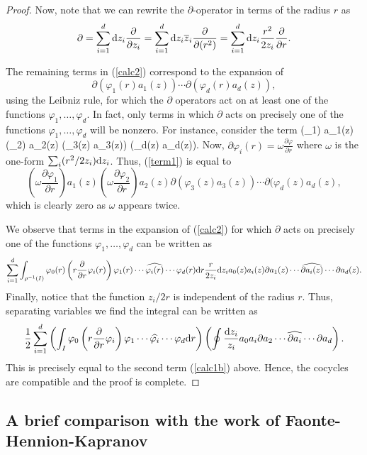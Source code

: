 \documentclass[10pt]{amsart}
\begin{document}
\begin{proof}
Now, note that we can rewrite the $\partial$-operator in terms of the radius $r$ as
\begin{align*}
\partial = \sum_{i=1}^d {\rm d} z_i \frac{\partial}{\partial z_i} = \sum_{i=1}^d {\rm d} z_i \overline{z}_i \frac{\partial}{\partial (r^2)} = \sum_{i=1}^d {\rm d} z_i \frac{r^2}{2 z_i} \frac{\partial}{\partial r} .
\end{align*}

The remaining terms in (\ref{calc2}) correspond to the expansion of
\[
\partial(\varphi_1(r) a_1(z)) \cdots \partial(\varphi_d(r) a_d(z)),
\]
using the Leibniz rule, for which the $\partial$ operators act on at least one of the functions $\varphi_1,\ldots,\varphi_d$. In fact, only terms in which $\partial$ acts on precisely one of the functions $\varphi_1,\ldots, \varphi_d$ will be nonzero. For instance, consider the term
\beqn\label{term1}
(\partial \varphi_1) a_1(z) (\partial \varphi_2) a_2(z) \partial(\varphi_3(z) a_3(z)) \cdots \partial(\varphi_d(z) a_d(z)).
\eeqn
Now, $\partial \varphi_i(r) = \omega \frac{\partial \varphi}{\partial r}$ where $\omega$ is the one-form $\sum_i (r^2 / 2 z_i) {\rm d} z_i$. Thus, (\ref{term1}) is equal to
\[
\left(\omega \frac{\partial \varphi_1}{\partial r} \right) a_1(z) \left(\omega \frac{\partial \varphi_2}{\partial r}  \right) a_2(z) \partial(\varphi_3(z) a_3(z)) \cdots \partial(\varphi_d(z) a_d(z),
\]
which is clearly zero as $\omega$ appears twice.

We observe that terms in the expansion of (\ref{calc2}) for which $\partial$ acts on precisely one of the functions $\varphi_1,\ldots,\varphi_d$ can be written as
\[
\sum_{i=1}^d \int_{\rho^{-1}(I)} \varphi_0(r)\left(r \frac{\partial}{\partial r} \varphi_i(r)\right) \varphi_1(r) \cdots \widehat{\varphi_i(r)} \cdots \varphi_d(r) {\rm d} r \frac{r}{2 z_i} {\rm d} z_i a_0(z) a_i(z) \partial a_1(z) \cdots \widehat{\partial a_i(z)} \cdots \partial a_d(z) .
\] 
Finally, notice that the function $z_i / 2r$ is independent of the radius $r$. Thus, separating variables we find the integral can be written as
\[
\frac{1}{2} \sum_{i=1}^d \left(\int_{I} \varphi_0 \left(r \frac{\partial}{\partial r} \varphi_i \right) \varphi_1 \cdots \widehat{\varphi_i } \cdots \varphi_d {\rm d} r\right) \left(\oint \frac{{\rm d} z_i}{z_i} a_0 a_i \partial a_2 \cdots \widehat{\partial a_i} \cdots \partial a_d \right) .
\]
This is precisely equal to the second term (\ref{calc1b}) above. Hence, the cocycles are compatible and the proof is complete. 
\end{proof}

\subsection{A brief comparison with the work of Faonte-Hennion-Kapranov}
\end{document}
